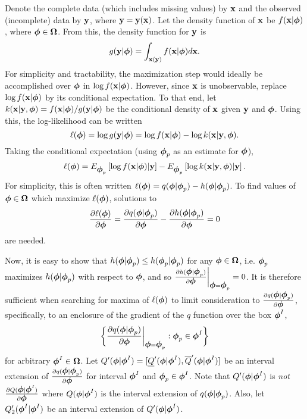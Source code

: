 Denote the complete data (which includes missing values)
by $\bfx$ and the observed (incomplete) data
by $\bfy$, where $\bfy = \bfy(\bfx)$.  Let the density function
of $\bfx$ be $f(\bfx|\bfphi)$, where $\bfphi \in \bfOmega$.  
From this, the density function for $\bfy$ is 
$$
g(\bfy|\bfphi) = \int_{\bfx(\bfy)} f(\bfx|\bfphi)d\bfx.
$$
For simplicity and tractability, the maximization step would ideally be
accomplished over $\bfphi$ in $\log f(\bfx|\bfphi)$.  However, since $\bfx$ is
unobservable, replace $\log f (\bfx|\bfphi)$ by its conditional
expectation.  To
that end, let $k(\bfx|\bfy,\bfphi) = f(\bfx|\bfphi) / g(\bfy|\bfphi)$
be the conditional density of $\bfx$ given $\bfy$ and $\bfphi$.
Using this, the log-likelihood can be written
$$
\ell(\bfphi) = \log g(\bfy|\bfphi) = \log f(\bfx|\bfphi) - 
  \log k(\bfx|\bfy,\bfphi).
$$
Taking the conditional expectation (using $\bfphi_p$ as an 
estimate for $\bfphi$), 
$$
\ell(\bfphi) = E_{\bfphi_p} \left[\log f(\bfx|\bfphi) | \bfy \right] - 
  E_{\bfphi_p} \left[ \log k(\bfx|\bfy,\bfphi) | \bfy \right].
$$
For simplicity, this is often written 
$\ell(\bfphi) = q(\bfphi|\bfphi_p) - h(\bfphi|\bfphi_p)$.
To find values of $\bfphi \in \bfOmega$ which maximize 
$\ell(\bfphi)$, solutions to
$$ 
\frac{\partial \ell(\bfphi)}{\partial \bfphi} = 
\frac{\partial q(\bfphi | \bfphi_p)}{\partial \bfphi} - 
\frac{\partial h(\bfphi | \bfphi_p)}{\partial \bfphi} = 0
$$
are needed.

Now, it is easy to show that 
$h(\bfphi | \bfphi_p) \leq h(\bfphi_p | \bfphi_p)$ for 
any $\bfphi \in \bfOmega$, i.e. $\bfphi_p$ maximizes $h(\bfphi | \bfphi_p)$ with
respect to $\bfphi$, and so 
$\frac{\partial h(\bfphi | \bfphi_p)}{\partial \bfphi}
  \bigg|_{\bfphi=\bfphi_p}=0$.  It is therefore sufficient when searching for
maxima of $\ell(\bfphi)$ to limit consideration to 
$ \frac{\partial q(\bfphi | \bfphi_p)}{\partial \bfphi}$, specifically, to 
an enclosure of the gradient of the $q$ function over the box $\bfphi^I$,
$$
\bigg\{ \frac{\partial q(\bfphi | \bfphi_p)}{\partial\bfphi} 
  \bigg|_{\bfphi=\bfphi_p} : \bfphi_p \in \bfphi^I \bigg\}
$$
for arbitrary $\bfphi^I \in \bfOmega$.
Let $Q'(\bfphi | \bfphi^I) =
[\underline{Q}'(\bfphi | \bfphi^I), \overline{Q}'(\bfphi | \bfphi^I)]$
be an interval extension of 
$\frac{\partial q(\bfphi|\bfphi_p)}{\partial\bfphi} $
for interval $\bfphi^I$ and $\bfphi_p \in \bfphi^I$.  Note that 
$Q'(\bfphi | \bfphi^I) $ is {\it not} 
$\frac{\partial Q(\bfphi | \bfphi^I )}{\partial \bfphi}$ where  
$Q(\bfphi | \bfphi^I)$ is the interval extension of $q(\bfphi | \bfphi_p)$.
Also, let $Q'_2(\bfphi^I | \bfphi^I)$ be an interval extension of
$Q'(\bfphi | \bfphi^I)$.

